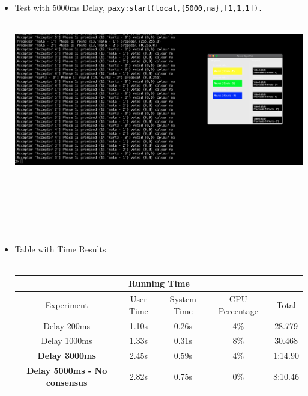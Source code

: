 \documentclass[a4paper, 10pt]{article}
\begin{document}
\begin{itemize}
\begin{minipage}[t]{\linewidth}
\end{minipage}
\item Test with 5000ms Delay, \color{red}{No Consensus reached} \lstinline|paxy:start(local,{5000,na},[1,1,1]).|\\\\
  \begin{minipage}[t]{\linewidth}
    \includegraphics[width=\textwidth]{delay5000ms}
  \end{minipage}\\\\\\\\\\
\item Table with Time Results\\\\
  \begin{table}[h!]
  \begin{tabular}{ |c|c|c|c|c|  }
    \hline
    \multicolumn{5}{|c|}{Running Time} \\
    \hline
    Experiment & User Time & System Time & CPU Percentage & Total\\
    \hline
    Delay 200ms & 1.10s & 0.26s & 4\% & 28.779\\
    Delay 1000ms & 1.33s & 0.31s & 8\% & 30.468\\
    \textbf{Delay 3000ms} & 2.45s & 0.59s & 4\% & 1:14.90\\
    \color{red}\textbf{Delay 5000ms - No consensus} & 2.82s & 0.75s & 0\% & 8:10.46\\
    \hline
  \end{tabular}
  \label{table:acceptorsDelay}
  \end{table}
\end{itemize}
\end{document}
